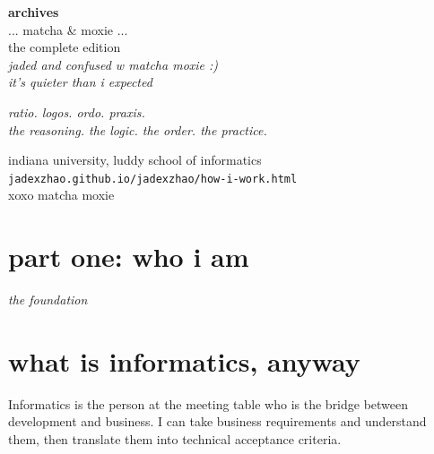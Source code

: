 \documentclass[12pt, letterpaper]{article}
\newenvironment{jadequote}{%
  \begin{mdframed}[backgroundcolor=soft, linecolor=moxie, linewidth=1pt,
    innerleftmargin=10pt, innerrightmargin=10pt,
    innertopmargin=8pt, innerbottommargin=8pt]
  \itshape
}{%
  \end{mdframed}
}
\begin{document}
\begin{titlepage}
  \centering
  \vspace*{2.5cm}
  {\Huge\bfseries\color{matcha} archives}\\[0.5em]
  {\large\color{moxie} ... matcha \& moxie ...}\\[2em]
  {\normalsize\color{gray} the complete edition}\\[1em]
  {\small\color{gray}\itshape jaded and confused w matcha moxie :)}\\[0.5em]
  {\small\color{gray}\itshape it's quieter than i expected}\\[3em]

  \vspace{1em}
  \begin{mdframed}[backgroundcolor=soft, linecolor=moxie, linewidth=0.5pt,
    innerleftmargin=20pt, innerrightmargin=20pt,
    innertopmargin=12pt, innerbottommargin=12pt]
  \centering\itshape\small\color{gray}
  ratio. logos. ordo. praxis.\\[0.3em]
  the reasoning. the logic. the order. the practice.
  \end{mdframed}

  \vfill
  {\small\color{gray} indiana university, luddy school of informatics}\\[0.3em]
  {\small\color{gray} \texttt{jadexzhao.github.io/jadexzhao/how-i-work.html}}\\[0.5em]
  {\small\color{moxie} xoxo matcha moxie}
\end{titlepage}

\tableofcontents
\newpage

\section*{\color{matcha} part one: who i am}
\vspace{-0.5em}
{\small\color{gray}\itshape the foundation}
\vspace{1em}

\section{what is informatics, anyway}

\begin{jadequote}
Informatics is the person at the meeting table who is the bridge between development and business. I can take business requirements and understand them, then translate them into technical acceptance criteria.
\end{jadequote}
\end{document}
